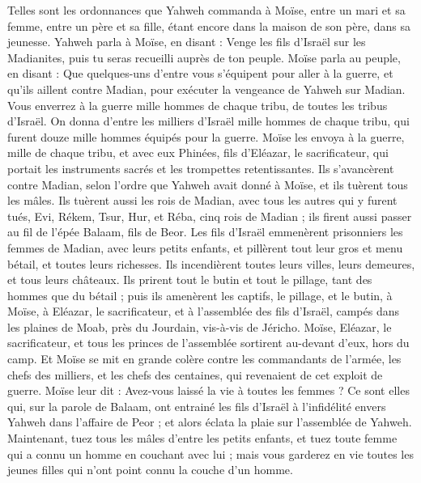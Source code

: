 \begin{multicols}{2}
Telles sont les ordonnances que Yahweh commanda à Moïse, entre un mari et sa femme, entre un père et sa fille, étant encore dans la maison de son père, dans sa jeunesse.
\VerseOne{}Yahweh parla à Moïse, en disant :
Venge les fils d'Israël sur les Madianites, puis tu seras recueilli auprès de ton peuple.
Moïse parla au peuple, en disant : Que quelques-uns d'entre vous s'équipent pour aller à la guerre, et qu'ils aillent contre Madian, pour exécuter la vengeance de Yahweh sur Madian.
Vous enverrez à la guerre mille hommes de chaque tribu, de toutes les tribus d'Israël.
On donna d'entre les milliers d'Israël mille hommes de chaque tribu, qui furent douze mille hommes équipés pour la guerre.
Moïse les envoya à la guerre, mille de chaque tribu, et avec eux Phinées, fils d'Eléazar, le sacrificateur, qui portait les instruments sacrés et les trompettes retentissantes.
Ils s’avancèrent contre Madian, selon l’ordre que Yahweh avait donné à Moïse, et ils tuèrent tous les mâles.
Ils tuèrent aussi les rois de Madian, avec tous les autres qui y furent tués, Evi, Rékem, Tsur, Hur, et Réba, cinq rois de Madian ; ils firent aussi passer au fil de l'épée Balaam, fils de Beor.
Les fils d'Israël emmenèrent prisonniers les femmes de Madian, avec leurs petits enfants, et pillèrent tout leur gros et menu bétail, et toutes leurs richesses.
Ils incendièrent toutes leurs villes, leurs demeures, et tous leurs châteaux.
Ils prirent tout le butin et tout le pillage, tant des hommes que du bétail ;
puis ils amenèrent les captifs, le pillage, et le butin, à Moïse, à Eléazar, le sacrificateur, et à l'assemblée des fils d'Israël, campés dans les plaines de Moab, près du Jourdain, vis-à-vis de Jéricho.
Moïse, Eléazar, le sacrificateur, et tous les princes de l'assemblée sortirent au-devant d'eux, hors du camp.
Et Moïse se mit en grande colère contre les commandants de l'armée, les chefs des milliers, et les chefs des centaines, qui revenaient de cet exploit de guerre.
Moïse leur dit : Avez-vous laissé la vie à toutes les femmes ?
Ce sont elles qui, sur la parole de Balaam, ont entrainé les fils d'Israël à l’infidélité envers Yahweh dans l’affaire de Peor ; et alors éclata la plaie sur l'assemblée de Yahweh.
Maintenant, tuez tous les mâles d'entre les petits enfants, et tuez toute femme qui a connu un homme en couchant avec lui ;
mais vous garderez en vie toutes les jeunes filles qui n'ont point connu la couche d’un homme.

\end{multicols}
